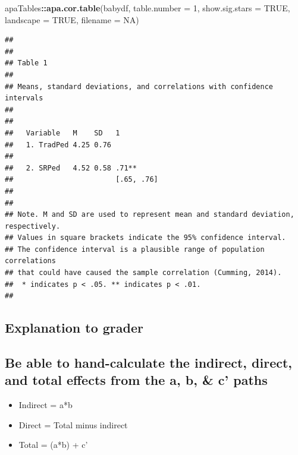 \documentclass[
  11pt,
]{book}
\newenvironment{Shaded}{\begin{snugshade}}{\end{snugshade}}
\newcommand{\AttributeTok}[1]{\textcolor[rgb]{0.27,0.27,0.27}{#1}}
\newcommand{\ConstantTok}[1]{\textcolor[rgb]{0.37,0.37,0.37}{#1}}
\newcommand{\DecValTok}[1]{\textcolor[rgb]{0.06,0.06,0.06}{#1}}
\newcommand{\FunctionTok}[1]{\textcolor[rgb]{0.27,0.27,0.27}{\textbf{#1}}}
\newcommand{\NormalTok}[1]{#1}
\newcommand{\SpecialCharTok}[1]{\textcolor[rgb]{0.43,0.43,0.43}{\textbf{#1}}}
\providecommand{\tightlist}{%
  \setlength{\itemsep}{0pt}\setlength{\parskip}{0pt}}
\begin{document}
\begin{Shaded}
\begin{Highlighting}[]
\NormalTok{apaTables}\SpecialCharTok{::}\FunctionTok{apa.cor.table}\NormalTok{(babydf, }\AttributeTok{table.number =} \DecValTok{1}\NormalTok{, }\AttributeTok{show.sig.stars =} \ConstantTok{TRUE}\NormalTok{,}
    \AttributeTok{landscape =} \ConstantTok{TRUE}\NormalTok{, }\AttributeTok{filename =} \ConstantTok{NA}\NormalTok{)}
\end{Highlighting}
\end{Shaded}

\begin{verbatim}
## 
## 
## Table 1 
## 
## Means, standard deviations, and correlations with confidence intervals
##  
## 
##   Variable   M    SD   1         
##   1. TradPed 4.25 0.76           
##                                  
##   2. SRPed   4.52 0.58 .71**     
##                        [.65, .76]
##                                  
## 
## Note. M and SD are used to represent mean and standard deviation, respectively.
## Values in square brackets indicate the 95% confidence interval.
## The confidence interval is a plausible range of population correlations 
## that could have caused the sample correlation (Cumming, 2014).
##  * indicates p < .05. ** indicates p < .01.
## 
\end{verbatim}

\hypertarget{explanation-to-grader}{%
\subsection*{Explanation to grader}\label{explanation-to-grader}}


\hypertarget{be-able-to-hand-calculate-the-indirect-direct-and-total-effects-from-the-a-b-c-paths}{%
\subsection*{Be able to hand-calculate the indirect, direct, and total effects from the a, b, \& c' paths}\label{be-able-to-hand-calculate-the-indirect-direct-and-total-effects-from-the-a-b-c-paths}}


\begin{itemize}
\tightlist
\item
  Indirect = a*b
\item
  Direct = Total minus indirect
\item
  Total = (a*b) + c'
\end{itemize}
\end{document}

